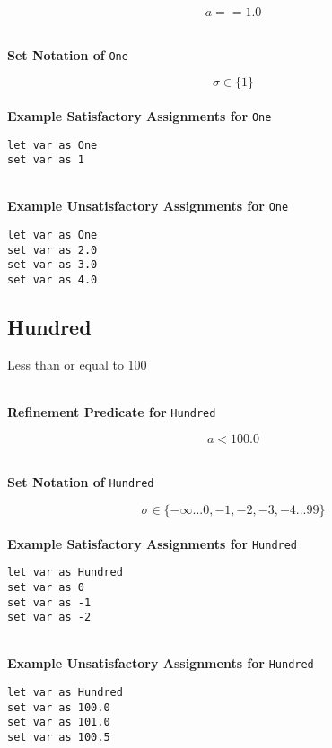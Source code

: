 \documentclass{article}
\begin{document}
$$ a == 1.0 $$

\textbf{\\ Set Notation of } \texttt{One}

$$\sigma \in \{ 1 \}$$ \ \
\textbf{\\ Example Satisfactory Assignments for } \texttt{One}
\begin{verbatim}
let var as One
set var as 1
\end{verbatim}


\textbf{\\ Example Unsatisfactory Assignments for } \texttt{One}
\begin{verbatim}
let var as One
set var as 2.0
set var as 3.0
set var as 4.0
\end{verbatim}


\clearpage

\subsection{Hundred}
Less than or equal to 100

\textbf{\\ Refinement Predicate for } \texttt{Hundred}

$$ a < 100.0 $$

\textbf{\\ Set Notation of } \texttt{Hundred}

$$\sigma \in \{ -\infty ... 0, -1, -2, -3, -4 ... 99 \}$$ \ \
\textbf{\\ Example Satisfactory Assignments for } \texttt{Hundred}
\begin{verbatim}
let var as Hundred
set var as 0
set var as -1
set var as -2
\end{verbatim}


\textbf{\\ Example Unsatisfactory Assignments for } \texttt{Hundred}
\begin{verbatim}
let var as Hundred
set var as 100.0
set var as 101.0
set var as 100.5
\end{verbatim}


\clearpage
\end{document}
